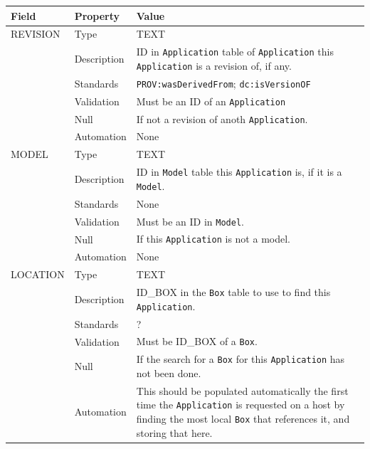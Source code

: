 \documentclass[
]{article}
\newcounter{none} %
\begin{document}
{\def\LTcaptype{none} %
\begin{longtable}[]{@{}
  >{\raggedright\arraybackslash}p{}
  >{\raggedright\arraybackslash}p{}
  >{\raggedright\arraybackslash}p{}@{}}
\toprule\noalign{}
\begin{minipage}[b]{\linewidth}\raggedright
Field
\end{minipage} & \begin{minipage}[b]{\linewidth}\raggedright
Property
\end{minipage} & \begin{minipage}[b]{\linewidth}\raggedright
Value
\end{minipage} \\
\midrule\noalign{}
\endhead
\bottomrule\noalign{}
\endlastfoot
REVISION & Type & TEXT \\
& Description & ID in \texttt{Application} table of \texttt{Application}
this \texttt{Application} is a revision of, if any. \\
& Standards & \texttt{PROV:wasDerivedFrom}; \texttt{dc:isVersionOF} \\
& Validation & Must be an ID of an \texttt{Application} \\
& Null & If not a revision of anoth \texttt{Application}. \\
& Automation & None \\
MODEL & Type & TEXT \\
& Description & ID in \texttt{Model} table this \texttt{Application} is,
if it is a \texttt{Model}. \\
& Standards & None \\
& Validation & Must be an ID in \texttt{Model}. \\
& Null & If this \texttt{Application} is not a model. \\
& Automation & None \\
LOCATION & Type & TEXT \\
& Description & ID\_BOX in the \texttt{Box} table to use to find this
\texttt{Application}. \\
& Standards & ? \\
& Validation & Must be ID\_BOX of a \texttt{Box}. \\
& Null & If the search for a \texttt{Box} for this \texttt{Application}
has not been done. \\
& Automation & This should be populated automatically the first time the
\texttt{Application} is requested on a host by finding the most local
\texttt{Box} that references it, and storing that here. \\
\end{longtable}
}
\end{document}
